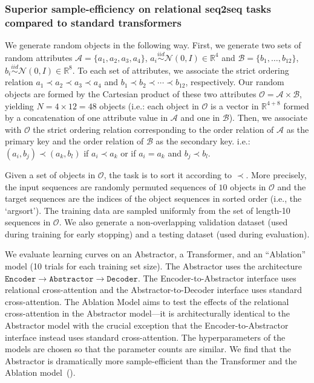 \subsubsection{Superior sample-efficiency on relational seq2seq tasks compared to standard transformers}

We generate random objects in the following way. First, we generate two sets of random attributes $\mathcal{A} = \{a_1, a_2, a_3, a_4\}$, $a_i \overset{iid}{\sim} \mathcal{N}(0, I) \in \mathbb{R}^{4}$ and $\mathcal{B} = \{b_1, \ldots, b_{12}\}$, $b_i \overset{iid}{\sim} \mathcal{N}(0, I) \in \mathbb{R}^{8}$. To each set of attributes, we associate the strict ordering relation $a_1 \prec a_2 \prec a_3 \prec a_4$ and $b_1 \prec b_2 \prec \cdots \prec b_{12}$, respectively. Our random objects are formed by the Cartesian product of these two attributes $\mathcal{O} = \mathcal{A} \times \mathcal{B}$, yielding $N = 4 \times 12 = 48$ objects (i.e.: each object in $\mathcal{O}$ is a vector in $\mathbb{R}^{4+8}$ formed by a concatenation of one attribute value in $\mathcal{A}$ and one in $\mathcal{B}$). Then, we associate with $\mathcal{O}$ the strict ordering relation corresponding to the order relation of $\mathcal{A}$ as the primary key and the order relation of $\mathcal{B}$ as the secondary key. i.e.: $(a_i, b_j) \prec (a_k, b_l)$ if $a_i \prec a_k$ or if $a_i = a_k$ and $b_j \prec b_l$.

Given a set of objects in $\mathcal{O}$, the task is to sort it according to $\prec$. More precisely, the input sequences are randomly permuted sequences of $10$ objects in $\mathcal{O}$ and the target sequences are the indices of the object sequences in sorted order (i.e., the `argsort'). The training data are sampled uniformly from the set of length-10 sequences in $\mathcal{O}$. We also generate a non-overlapping validation dataset (used during training for early stopping) and a testing dataset (used during evaluation).

We evaluate learning curves on an Abstractor, a Transformer, and an ``Ablation'' model (10 trials for each training set size). The Abstractor uses the architecture $\texttt{Encoder} \to \texttt{Abstractor} \to \texttt{Decoder}$. The Encoder-to-Abstractor interface uses relational cross-attention and the Abstractor-to-Decoder interface uses standard cross-attention. The Ablation Model aims to test the effects of the relational cross-attention in the Abstractor model---it is architecturally identical to the Abstractor model with the crucial exception that the Encoder-to-Abstractor interface instead uses standard cross-attention. The hyperparameters of the models are chosen so that the parameter counts are similar. %
We find that the Abstractor is dramatically more sample-efficient than the Transformer and the Ablation model~().

